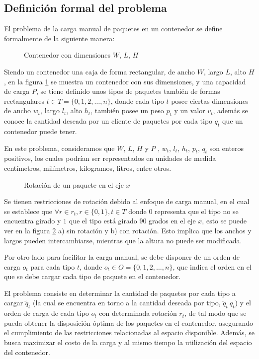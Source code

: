 \subsection{Definición formal del problema}

El problema de la carga manual de paquetes en un contenedor se define formalmente de la siguiente manera:

\begin{figure}[H]
    \centering
    
    \caption{Contenedor con dimensiones $W$, $L$, $H$}
    \label{fig:container}
\end{figure}

Siendo un contenedor una caja de forma rectangular, de ancho $W$, largo $L$, alto $H$, en la figura \ref{fig:container} se muestra un contenedor con sus dimensiones, y una capacidad de carga $P$, se tiene definido unos tipos de paquetes también de formas rectangulares $t \in T = \{0, 1, 2, \ldots, n\}$, donde cada tipo $t$ posee ciertas dimensiones de ancho $w_t$, largo $l_t$, alto $h_t$, también posee un peso $p_t$ y un valor $v_t$, además se conoce la cantidad deseada por un cliente de paquetes por cada tipo $q_t$ que un contenedor puede tener.

En este problema, consideramos que $W$, $L$, $H$ y $P$ , $w_t$, $l_t$, $h_t$, $p_t$, $q_t$ son enteros positivos, los cuales podrían ser representados en unidades de medida centímetros, milímetros, kilogramos, litros, entre otros.

\begin{figure}[H]
    \centering
    
    \caption{Rotación de un paquete en el eje $x$}
    \label{fig:rotation}
\end{figure}

Se tienen restricciones de rotación debido al enfoque de carga manual, en el cual se establece que $\forall r \in r_t, r \in \{0, 1\}, t \in T$ donde $0$ representa que el tipo no se encuentra girado y $1$ que el tipo está girado 90 grados en el eje $x$, esto se puede ver en la figura \ref{fig:rotation} a) sin rotación y b) con rotación. Esto implica que los anchos y largos pueden intercambiarse, mientras que la altura no puede ser modificada.

Por otro lado para facilitar la carga manual, se debe disponer de un orden de carga $o_t$ para cada tipo $t$, donde $o_t \in O = \{0, 1, 2, \ldots, n\}$, que indica el orden en el que se debe cargar cada tipo de paquete en el contenedor.

El problema consiste en determinar la cantidad de paquetes por cada tipo a cargar $\tilde{q}_t$ (la cual se encuentra en torno a la cantidad deseada por tipo, $\tilde{q}_t ~ q_t$) y el orden de carga de cada tipo $o_t$ con determinada rotación $r_t$, de tal modo que se pueda obtener la disposición óptima de los paquetes en el contenedor, asegurando el cumplimiento de las restricciones relacionadas al espacio disponible. Además, se busca maximizar el costo de la carga y al mismo tiempo la utilización del espacio del contenedor.
